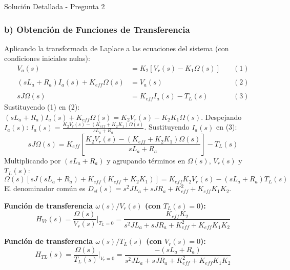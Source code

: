 \documentclass[12pt]{article}
\begin{document}
\begin{solutionbox}{Solución Detallada - Pregunta 2}
\subsubsection*{b) Obtención de Funciones de Transferencia}
Aplicando la transformada de Laplace a las ecuaciones del sistema (con condiciones iniciales nulas):
\begin{align*}
    V_a(s) &= K_2 [V_r(s) - K_1 \Omega(s)] \quad &(1)\\\\
    (sL_a + R_a)I_a(s) + K_{eff}\Omega(s) &= V_a(s) \quad &(2)\\\\
    sJ\Omega(s) &= K_{eff} I_a(s) - T_L(s) \quad &(3)
\end{align*}
Sustituyendo (1) en (2): $(sL_a + R_a)I_a(s) + K_{eff}\Omega(s) = K_2 V_r(s) - K_2 K_1 \Omega(s)$.
Despejando $I_a(s)$: $I_a(s) = \frac{K_2 V_r(s) - (K_{eff} + K_2 K_1)\Omega(s)}{sL_a + R_a}$.
Sustituyendo $I_a(s)$ en (3):
\[ sJ\Omega(s) = K_{eff} \left[ \frac{K_2 V_r(s) - (K_{eff} + K_2 K_1)\Omega(s)}{sL_a + R_a} \right] - T_L(s) \]
Multiplicando por $(sL_a + R_a)$ y agrupando términos en $\Omega(s)$, $V_r(s)$ y $T_L(s)$:
\[ \Omega(s)[sJ(sL_a + R_a) + K_{eff}(K_{eff} + K_2 K_1)] = K_{eff}K_2 V_r(s) - (sL_a + R_a)T_L(s) \]
El denominador común es $D_{cl}(s) = s^2JL_a + sJR_a + K_{eff}^2 + K_{eff}K_1K_2$.

\textbf{Función de transferencia $\omega(s)/V_r(s)$ (con $T_L(s)=0$):}
\begin{equation}
    H_{Vr}(s) = \frac{\Omega(s)}{V_r(s)}\Bigg|_{T_L=0} = \frac{K_{eff}K_2}{s^2JL_a + sJR_a + K_{eff}^2 + K_{eff}K_1K_2}
\end{equation}

\textbf{Función de transferencia $\omega(s)/T_L(s)$ (con $V_r(s)=0$):}
\begin{equation}
    H_{TL}(s) = \frac{\Omega(s)}{T_L(s)}\Bigg|_{V_r=0} = \frac{-(sL_a + R_a)}{s^2JL_a + sJR_a + K_{eff}^2 + K_{eff}K_1K_2}
\end{equation}


\end{solutionbox}
\end{document}
